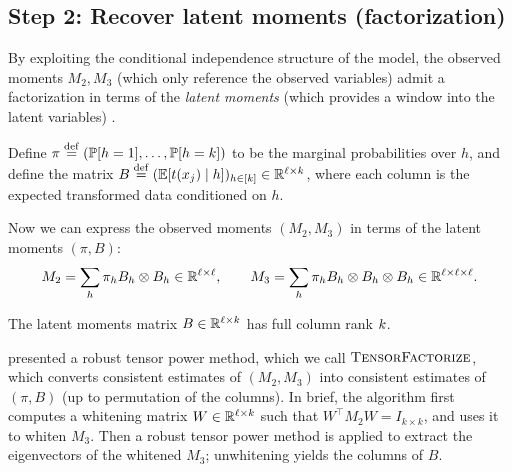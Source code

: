 \subsection{Step 2: Recover latent moments (factorization)}
\label{sec:factorization}

By exploiting the conditional independence structure of the model, the observed
moments $M_2,M_3$ (which only reference the observed variables) admit a
factorization in terms of the \emph{latent moments}
(which provides a window into the latent variables) \cite{anandkumar12moments}.

Define
$\pi \stackrel{\rm def}{=} (\mathbb{P}[h=1], \dots, \mathbb{P}[h=k])$ to be the marginal probabilities
over $h$,
and define the matrix $B \stackrel{\rm def}{=} (\mathbb{E}[t(x_j) \mid h])_{h \in [k]} \in \mathbb{R}^{\ell \times k}$,
where each column is the expected transformed data conditioned on $h$.

Now we can express the observed moments $(M_2,M_3)$ in terms of the latent moments $(\pi,B)$:
\begin{align}
  M_2 = \sum_h \pi_h B_h \otimes B_h \in \mathbb{R}^{\ell \times \ell}, \quad\quad
  M_3 = \sum_h \pi_h B_h \otimes B_h \otimes B_h \in \mathbb{R}^{\ell \times \ell \times \ell}.
\end{align}
\begin{assumption}
  The latent moments matrix $B \in \mathbb{R}^{\ell \times k}$ has full column rank $k$.
\end{assumption}

\citep{anandkumar13tensor} presented a robust tensor power method, which we call $\text{\sc TensorFactorize}$,
which converts consistent estimates of $(M_2,M_3)$ into consistent estimates of $(\pi, B)$ (up to permutation of the columns).
In brief, the algorithm first computes a whitening matrix $W \in \mathbb{R}^{\ell \times k}$ such that $W^\top M_2 W = I_{k \times k}$,
and uses it to whiten $M_3$.  Then a robust tensor power method is applied to
extract the eigenvectors of the whitened $M_3$;
unwhitening yields the columns of $B$.

